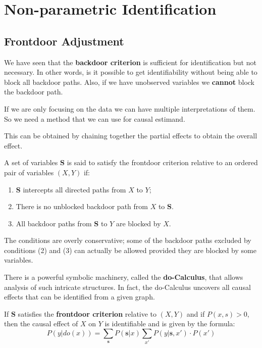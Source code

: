 \chapter{Non-parametric Identification}
\section{Frontdoor Adjustment}
We have seen that the \textbf{backdoor criterion} is sufficient for identification
but not necessary. In other words, is it possible to get identifiability without
being able to block all backdoor paths. Also, if we have unobserved variables we
\textbf{cannot} block the backdoor path.

If we are only focusing on the data we can have multiple interpretations of them.
So we need a method that we can use for causal estimand.

This can be obtained by chaining together the partial effects to obtain the overall effect.
\begin{definition}
    A set of variables $\mathbf{S}$ is said to satisfy the frontdoor criterion
    relative to an ordered pair of variables $(X, Y)$ if:
    \begin{enumerate}
        \item $\mathbf{S}$ intercepts all directed paths from $X$ to $Y$;
        \item There is no unblocked backdoor path from $X$ to $\mathbf{S}$.
        \item All backdoor paths from $\mathbf{S}$ to $Y$ are blocked by $X$.
    \end{enumerate}
\end{definition}
The conditions are overly conservative; some of the backdoor paths excluded by
conditions (2) and (3) can actually be allowed provided they are blocked by some
variables.

There is a powerful symbolic machinery, called the \textbf{do-Calculus}, that allows
analysis of such intricate structures. In fact, the do-Calculus uncovers all causal
effects that can be identified from a given graph.

\begin{definition}
    If $\mathbf{S}$ satisfies the \textbf{frontdoor criterion} relative to $(X, Y)$
    and if $P(x, s) > 0$, then the causal effect of $X$ on $Y$ is identifiable
    and is given by the formula:
    \begin{equation}
        P(y | do(x)) = \sum_{\mathbf{s}} P(\mathbf{s} | x) \sum_{x'} P(y | \mathbf{s}, x') \cdot P(x')
    \end{equation}
\end{definition}


